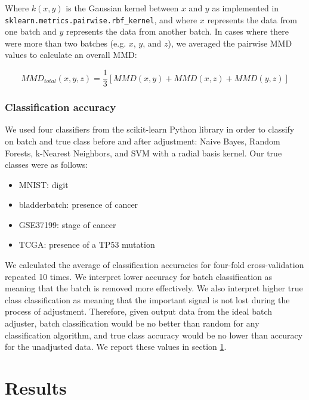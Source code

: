 \documentclass[notitlepage]{article}
\begin{document}
Where $k(x, y)$ is the Gaussian kernel between $x$ and $y$ as implemented in \texttt{sklearn.metrics.pairwise.rbf\_kernel}, and where $x$ represents the data from one batch and $y$ represents the data from another batch.
In cases where there were more than two batches (e.g. $x$, $y$, and $z$), we averaged the pairwise MMD values to calculate an overall MMD:

\begin{equation}
	\label{mmd-mean}
	MMD_{total}(x, y, z) = \frac{1}{3}[MMD(x, y) + MMD(x, z) + MMD(y, z)]
\end{equation}

\subsubsection{Classification accuracy}

We used four classifiers from the scikit-learn Python library in order to classify on batch and true class before and after adjustment: Naive Bayes, Random Forests, k-Nearest Neighbors, and SVM with a radial basis kernel.
Our true classes were as follows:

\begin{itemize}
	\item MNIST: digit
	\item bladderbatch: presence of cancer
	\item GSE37199: stage of cancer
	\item TCGA: presence of a TP53 mutation
\end{itemize}

We calculated the average of classification accuracies for four-fold cross-validation repeated 10 times.
We interpret lower accuracy for batch classification as meaning that the batch is removed more effectively.
We also interpret higher true class classification as meaning that the important signal is not lost during the process of adjustment.
Therefore, given output data from the ideal batch adjuster, batch classification would be no better than random for any classification algorithm, and true class accuracy would be no lower than accuracy for the unadjusted data.
We report these values in section \ref{sec:results}.

\section{Results} \label{sec:results}

\end{document}
